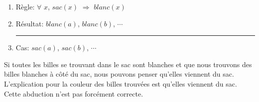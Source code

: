 \begin{enumerate}
  \item Règle: $\forall$ $x$, $sac(x)$ $\Rightarrow$ $blanc(x)$
  \item Résultat: $blanc(a)$, $blanc(b)$, $\cdots$\\
  \rule{5.5cm}{.1pt}
  \item Cas: $sac(a)$, $sac(b)$, $\cdots$
\end{enumerate}

Si toutes les billes se trouvant dans le sac sont blanches et que nous trouvons des billes blanches à côté du sac, nous pouvons penser qu'elles viennent du sac.
L'explication pour la couleur des billes trouvées est qu'elles viennent du sac.
Cette abduction n'est pas forcément correcte.
